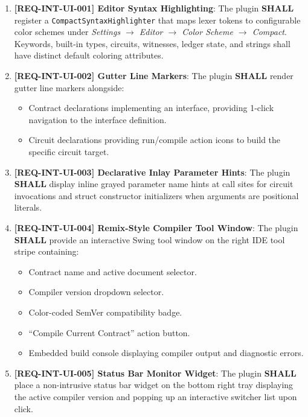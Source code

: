 \begin{enumerate}
    \item \textbf{[REQ-INT-UI-001] Editor Syntax Highlighting}:
    The plugin \textbf{SHALL} register a \texttt{CompactSyntaxHighlighter} that maps lexer tokens to configurable color schemes under \textit{Settings $\to$ Editor $\to$ Color Scheme $\to$ Compact}. Keywords, built-in types, circuits, witnesses, ledger state, and strings shall have distinct default coloring attributes.
    
    \item \textbf{[REQ-INT-UI-002] Gutter Line Markers}:
    The plugin \textbf{SHALL} render gutter line markers alongside:
    \begin{itemize}
        \item Contract declarations implementing an interface, providing 1-click navigation to the interface definition.
        \item Circuit declarations providing run/compile action icons to build the specific circuit target.
    \end{itemize}
    
    \item \textbf{[REQ-INT-UI-003] Declarative Inlay Parameter Hints}:
    The plugin \textbf{SHALL} display inline grayed parameter name hints at call sites for circuit invocations and struct constructor initializers when arguments are positional literals.
    
    \item \textbf{[REQ-INT-UI-004] Remix-Style Compiler Tool Window}:
    The plugin \textbf{SHALL} provide an interactive Swing tool window on the right IDE tool stripe containing:
    \begin{itemize}
        \item Contract name and active document selector.
        \item Compiler version dropdown selector.
        \item Color-coded SemVer compatibility badge.
        \item ``Compile Current Contract'' action button.
        \item Embedded build console displaying compiler output and diagnostic errors.
    \end{itemize}
    
    \item \textbf{[REQ-INT-UI-005] Status Bar Monitor Widget}:
    The plugin \textbf{SHALL} place a non-intrusive status bar widget on the bottom right tray displaying the active compiler version and popping up an interactive switcher list upon click.
\end{enumerate}

